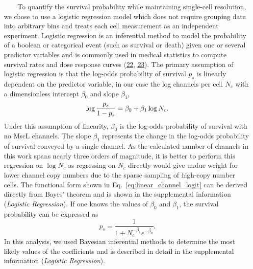 ~~~~To
quantify
the
survival
probability
while
maintaining
single-cell
resolution,
we
chose
to use
a
logistic
regression
model
which
does
not
require
grouping
data
into
arbitrary
bins
and
treats
each
cell
measurement
as an
independent
experiment.
Logistic
regression
is an
inferential
method
to
model
the
probability
of a
boolean
or
categorical
event
(such
as
survival
or
death)
given
one or
several
predictor
variables
and is
commonly
used
in
medical
statistics
to
compute
survival
rates
and
dose
response
curves
(\protect\hyperlink{ref-anderson2003}{22},
\protect\hyperlink{ref-mishra2016}{23}).
The
primary
assumption
of
logistic
regression
is
that
the
log-odds
probability
of
survival
\(p_{s}\)
is
linearly
dependent
on the
predictor
variable,
in our
case
the
log
channels
per
cell
\(N_{c}\)
with a
dimensionless
intercept
\(\beta_0\)
and
slope
\(\beta_1\),
\begin{equation}
\log{p_s \over 1 - p_s} = \beta_0 + \beta_1 \log N_c.
\label{eq:linear_channel_logit}\end{equation}
Under
this
assumption
of
linearity,
\(\beta_0\)
is the
log-odds
probability
of
survival
with
no
MscL
channels.
The
slope
\(\beta_1\)
represents
the
change
in the
log-odds
probability
of
survival
conveyed
by a
single
channel.
As the
calculated
number
of
channels
in
this
work
spans
nearly
three
orders
of
magnitude,
it is
better
to
perform
this
regression
on
\(\log N_c\)
as
regressing
on
\(N_c\)
directly
would
give
undue
weight
for
lower
channel
copy
numbers
due to
the
sparse
sampling
of
high-copy
number
cells.
The
functional
form
shown
in
Eq.~\ref{eq:linear_channel_logit}
can be
derived
directly
from
Bayes'
theorem
and is
shown
in the
supplemental
information
(\emph{Logistic
Regression}).
If one
knows
the
values
of
\(\beta_0\)
and
\(\beta_1\),
the
survival
probability
can be
expressed
as
\begin{equation}
p_s = \frac{1}{1 + N_c^{-\beta_1}e^{-\beta_0}}.
\label{eq:prob}\end{equation}
In
this
analysis,
we
used
Bayesian
inferential
methods
to
determine
the
most
likely
values
of the
coefficients
and is
described
in
detail
in the
supplemental
information
(\emph{Logistic
Regression}).

